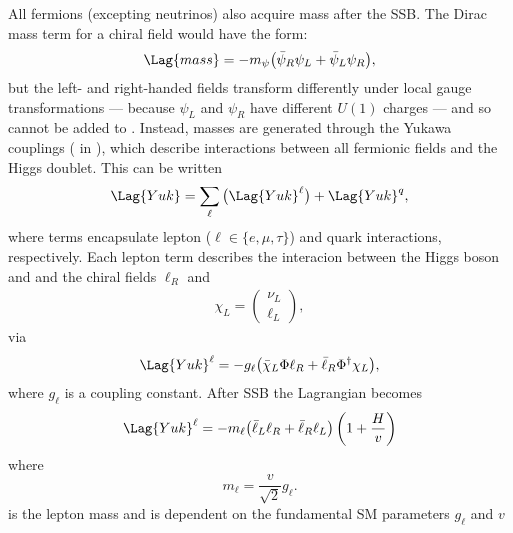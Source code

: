 All fermions (excepting neutrinos) also acquire mass after the SSB.
The Dirac mass term for a chiral field would have the form:
\begin{equation}
  \Lag{mass} = -m_\psi\big(\bar\psi_R\psi_L + \bar\psi_L\psi_R\big),
\end{equation}
but the left- and right-handed fields
transform differently under local gauge transformations
--- because $\psi_L$ and $\psi_R$ have different $U(1)$ charges ---
and so cannot be added to .
Instead, masses are generated through the Yukawa couplings ( in ), which
describe interactions between all fermionic fields and the Higgs doublet.
This can be written
\begin{equation}
  \Lag{Yuk} = \sum_{\ell}\big(\Lag{Yuk}^\ell\big) + \Lag{Yuk}^q,
  \label{eq:th:yukking}
\end{equation}
where terms encapsulate lepton ($\ell\in\{e,\mu,\tau\}$) and quark interactions, respectively.
Each lepton term describes the interacion between the Higgs boson and and the chiral fields
$\ell_R$ and
\begin{align}
  \chi_L = \begin{pmatrix}\nu_L \\ \ell_L \end{pmatrix},
\end{align}
via
\begin{equation}
  \Lag{Yuk}^\ell
  = - g_\ell\big(\bar\chi_L\Phi \ell_R + \bar \ell_R\Phi^\dagger\chi_L\big),
\end{equation}
where $g_\ell$ is a coupling constant.
After SSB the Lagrangian becomes
\begin{align}
  \Lag{Yuk}^\ell
  = - m_\ell \big(\bar\ell_L\ell_R + \bar\ell_R\ell_L\big)%
  \left(1 + \frac{H}{v}\right)
\end{align}
where
\begin{equation}
  m_\ell = \frac{v}{\sqrt{2}}g_\ell.
  \label{eq:leptonmass}
\end{equation}
is the lepton mass and is dependent on the fundamental SM parameters $g_\ell$ and $v$

